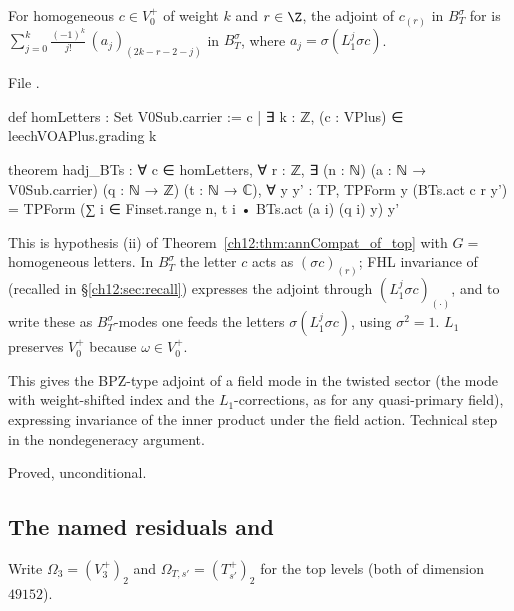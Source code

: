 \begin{lemma}\label{ch12:lem:hadj}
For homogeneous $c\in V_0^+$ of weight $k$ and $r\in\Z$, the adjoint of $c_{(r)}$ in $B_T^\sigma$ for
 is $\sum_{j=0}^{k}\frac{(-1)^k}{j!}\,(a_j)_{(2k-r-2-j)}$ in $B_T^\sigma$, where
$a_j=\sigma(L_1^j\sigma c)$.
\end{lemma}
File .
\begin{leancode}
def homLetters : Set V0Sub.carrier := {c | ∃ k : ℤ, (c : VPlus) ∈ leechVOAPlus.grading k}

theorem hadj_BTs : ∀ c ∈ homLetters, ∀ r : ℤ, ∃ (n : ℕ) (a : ℕ → V0Sub.carrier) (q : ℕ → ℤ)
    (t : ℕ → ℂ), ∀ y y' : TP,
      TPForm y (BTs.act c r y') = TPForm (∑ i ∈ Finset.range n, t i • BTs.act (a i) (q i) y) y'
\end{leancode}
\begin{dictionary}
This is hypothesis (ii) of Theorem~\ref{ch12:thm:annCompat_of_top} with $G=$ homogeneous letters.
In $B_T^\sigma$ the letter $c$ acts as $(\sigma c)_{(r)}$; FHL invariance of  (recalled in
\S\ref{ch12:sec:recall}) expresses the adjoint through $(L_1^j\sigma c)_{(\cdot)}$, and to write these
as $B_T^\sigma$-modes one feeds the letters $\sigma(L_1^j\sigma c)$, using $\sigma^2=1$.  $L_1$
preserves $V_0^+$ because $\omega\in V_0^+$.
\end{dictionary}

\begin{physics}
This gives the BPZ-type adjoint of a field mode in the twisted sector (the mode with weight-shifted index and the $L_1$-corrections, as for any quasi-primary field), expressing invariance of the inner product under the field action. Technical step in the nondegeneracy argument.
\end{physics}
\begin{status}Proved, unconditional.\end{status}

\subsection{The named residuals \texorpdfstring{}{TopSigmaV3} and \texorpdfstring{}{TopSigmaTT}}

Write $\Omega_3=(V_3^+)_2$ and $\Omega_{T,s'}=(T_{s'}^+)_2$ for the top levels (both of dimension
$49152$).

